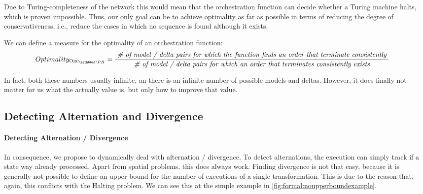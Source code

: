 Due to Turing-completeness of the network this would mean that the orchestration function can decide whether a Turing machine halts, which is proven impossible.
Thus, our only goal can be to achieve optimality as far as possible in terms of reducing the degree of conservativeness, i.e., reduce the cases in which no sequence is found although it exists.

We can define a measure for the optimality of an orchestration function:
\begin{align*}
    &
    Optimality_{\orcfunction{\consistencypreservationruleset{}}} = \frac{\mathtext{\# of model / delta pairs for which the function finds an order that terminate consistently}}{\mathtext{\# of model / delta pairs for which an order that terminates consistently exists}}
\end{align*}

In fact, both these numbers usually infinite, an there is an infinite number of possible models and deltas. However, it does finally not matter for us what the actually value is, but only how to improve that value.


\subsection{Detecting Alternation and Divergence}

\paragraph{Detecting Alternation / Divergence}

In consequence, we propose to dynamically deal with alternation / divergence.
To detect alternations, the execution can simply track if a state way already processed. Apart from spatial problems, this does always work.
Finding divergence is not that easy, because it is generally not possible to define an upper bound for the number of executions of a single transformation.
This is due to the reason that, again, this conflicts with the Halting problem.
We can see this at the simple example in \autoref{fig:formal:noupperboundexample}.

